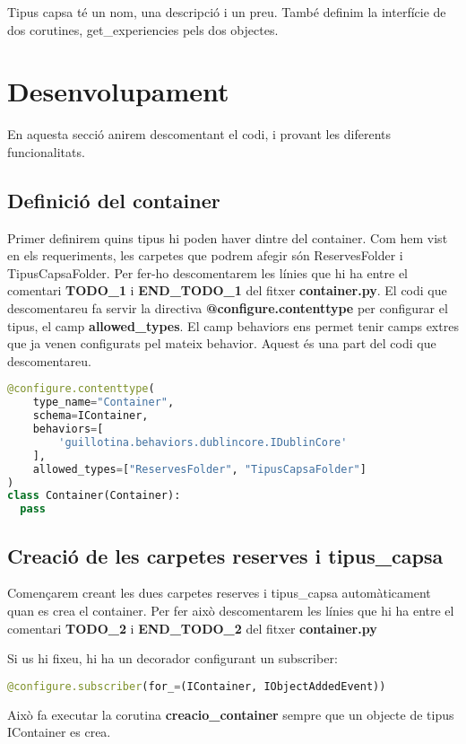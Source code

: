 \documentclass[a4paper, 11pt]{article}
\begin{document}
  Tipus capsa té un nom, una descripció i un preu. També definim la
  interfície de dos corutines, get\_experiencies pels dos objectes.


\pagebreak

\section{Desenvolupament}
En aquesta secció anirem descomentant el codi, i provant les diferents
funcionalitats.
\subsection{Definició del container}
Primer definirem quins tipus hi poden haver dintre del container. Com
hem vist en els requeriments, les carpetes que podrem afegir són
ReservesFolder i TipusCapsaFolder. Per fer-ho descomentarem les línies
que hi ha entre el comentari \textbf{TODO\_1} i \textbf{END\_TODO\_1}
del fitxer \textbf{container.py}. El codi que descomentareu fa servir
la directiva \textbf{{@}configure.contenttype} per configurar el
tipus, el camp \textbf{allowed\_types}. El camp behaviors ens permet
tenir camps extres que ja venen configurats pel mateix
behavior. Aquest és una part del codi que descomentareu.

\begin{lstlisting}[language=Python, caption=Definició container]
@configure.contenttype(
    type_name="Container",
    schema=IContainer,
    behaviors=[
        'guillotina.behaviors.dublincore.IDublinCore'
    ],
    allowed_types=["ReservesFolder", "TipusCapsaFolder"]
)
class Container(Container):
  pass
\end{lstlisting}


\subsection{Creació de les carpetes reserves i tipus\_capsa}
Començarem creant les dues carpetes reserves i tipus\_capsa
automàticament quan es crea el container. Per fer això descomentarem
les línies que hi ha entre el comentari \textbf{TODO\_2} i
\textbf{END\_TODO\_2} del fitxer \textbf{container.py}

Si us hi fixeu, hi ha un decorador configurant un subscriber:
\begin{lstlisting}[language=Python, caption=Subscriber container]
  @configure.subscriber(for_=(IContainer, IObjectAddedEvent))
\end{lstlisting}
Això fa executar la corutina \textbf{creacio\_container} sempre que un objecte
de tipus IContainer es crea.
  
\end{document}

